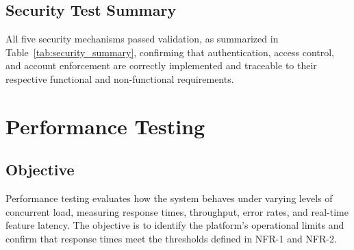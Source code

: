 \subsection{Security Test Summary}
All five security mechanisms passed validation, as summarized in Table~\ref{tab:security_summary}, confirming that authentication, access control, and account enforcement are correctly implemented and traceable to their respective functional and non-functional requirements.


\begin{table}[H]
\caption{Security test results summary with NFR traceability}
\centering
\footnotesize
\renewcommand{\arraystretch}{1.3}

\label{tab:security_summary}
\end{table}

\section{Performance Testing}

\subsection{Objective}

Performance testing evaluates how the system behaves under varying levels of concurrent load, measuring response times, throughput, error rates, and real-time feature latency. The objective is to identify the platform's operational limits and confirm that response times meet the thresholds defined in NFR-1 and NFR-2.

